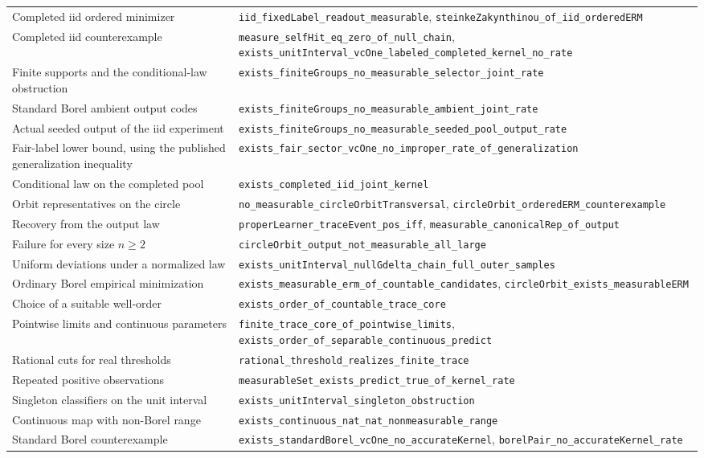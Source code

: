\documentclass[11pt]{article}
\theoremstyle{definition}\newtheorem{definition}[theorem]{Definition}
\newcommand{\decl}[1]{{\small\nolinkurl{#1}}}
\begin{document}
{\begin{longtable}{@{}>{\raggedright\arraybackslash}p{.36\linewidth}>{\raggedright\arraybackslash}p{.60\linewidth}@{}}
Completed iid ordered minimizer & \decl{iid_fixedLabel_readout_measurable}, \decl{steinkeZakynthinou_of_iid_orderedERM} \\
Completed iid counterexample & \decl{measure_selfHit_eq_zero_of_null_chain}, \decl{exists_unitInterval_vcOne_labeled_completed_kernel_no_rate} \\
Finite supports and the conditional-law obstruction & \decl{exists_finiteGroups_no_measurable_selector_joint_rate} \\
Standard Borel ambient output codes & \decl{exists_finiteGroups_no_measurable_ambient_joint_rate} \\
Actual seeded output of the iid experiment & \decl{exists_finiteGroups_no_measurable_seeded_pool_output_rate} \\
Fair-label lower bound, using the published generalization inequality & \decl{exists_fair_sector_vcOne_no_improper_rate_of_generalization} \\
Conditional law on the completed pool & \decl{exists_completed_iid_joint_kernel} \\
Orbit representatives on the circle & \decl{no_measurable_circleOrbitTransversal}, \decl{circleOrbit_orderedERM_counterexample} \\
Recovery from the output law & \decl{properLearner_traceEvent_pos_iff}, \decl{measurable_canonicalRep_of_output} \\
Failure for every size $n\ge2$ & \decl{circleOrbit_output_not_measurable_all_large} \\
Uniform deviations under a normalized law & \decl{exists_unitInterval_nullGdelta_chain_full_outer_samples} \\
Ordinary Borel empirical minimization & \decl{exists_measurable_erm_of_countable_candidates}, \decl{circleOrbit_exists_measurableERM} \\
Choice of a suitable well-order & \decl{exists_order_of_countable_trace_core} \\
Pointwise limits and continuous parameters & \decl{finite_trace_core_of_pointwise_limits}, \decl{exists_order_of_separable_continuous_predict} \\
Rational cuts for real thresholds & \decl{rational_threshold_realizes_finite_trace} \\
Repeated positive observations & \decl{measurableSet_exists_predict_true_of_kernel_rate} \\
Singleton classifiers on the unit interval & \decl{exists_unitInterval_singleton_obstruction} \\
Continuous map with non-Borel range & \decl{exists_continuous_nat_nat_nonmeasurable_range} \\
Standard Borel counterexample & \decl{exists_standardBorel_vcOne_no_accurateKernel}, \decl{borelPair_no_accurateKernel_rate} \\
\bottomrule
\end{longtable}}
\end{document}
